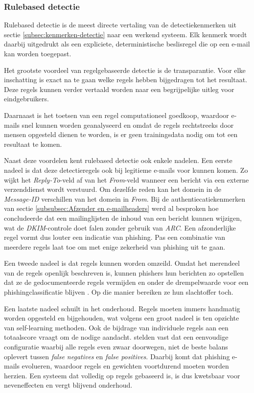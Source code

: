 \subsubsection{Rulebased detectie}
\label{subsubsec:rulebased-detectie}

Rulebased detectie is de meest directe vertaling van de detectiekenmerken uit sectie \ref{subsec:kenmerken-detectie} naar een werkend systeem. Elk kenmerk wordt daarbij uitgedrukt als een expliciete, deterministische beslisregel die op een e-mail kan worden toegepast.

Het grootste voordeel van regelgebaseerde detectie is de transparantie. Voor elke inschatting is exact na te gaan welke regels hebben bijgedragen tot het resultaat. Deze regels kunnen verder vertaald worden naar een begrijpelijke uitleg voor eindgebruikers.

Daarnaast is het toetsen van een regel computationeel goedkoop, waardoor e-mails snel kunnen worden geanalyseerd en omdat de regels rechtstreeks door mensen opgesteld dienen te worden, is er geen trainingsdata nodig om tot een resultaat te komen.

Naast deze voordelen kent rulebased detectie ook enkele nadelen. Een eerste nadeel is dat deze detectieregels ook bij legitieme e-mails voor kunnen komen. Zo wijkt het \emph{Reply-To}-veld af van het \emph{From}-veld wanneer een bericht via een externe verzenddienst wordt verstuurd. Om dezelfde reden kan het domein in de \emph{Message-ID} verschillen van het domein in \emph{From}. Bij de authentiecatiekenmerken van sectie \ref{subsubsec:Afzender en e-mailheaders} werd al besproken hoe \textcite{Herr2026} concludeerde dat een mailinglijsten de inhoud van een bericht kunnen wijzigen, wat de \emph{DKIM}-controle doet falen zonder gebruik van \emph{ARC}.
Een afzonderlijke regel vormt dus louter een indicatie van phishing. Pas een combinatie van meerdere regels laat toe om met enige zekerheid van phishing uit te gaan.

Een tweede nadeel is dat regels kunnen worden omzeild. Omdat het merendeel van de regels openlijk beschreven is, kunnen phishers hun berichten zo opstellen dat ze de gedocumenteerde regels vermijden en onder de drempelwaarde voor een phishingclassificatie blijven \autocite{Biggio2017}. Op die manier bereiken ze hun slachtoffer toch.

Een laatste nadeel schuilt in het onderhoud. Regels moeten immers handmatig worden opgesteld en bijgehouden, wat volgens \textcite{Sebastiani2001} een groot nadeel is ten opzichte van self-learning methoden. Ook de bijdrage van individuele regels aan een totaalscore vraagt om de nodige aandacht. \textcite{Basnet2012} stelden vast dat een eenvoudige configuratie waarbij alle regels even zwaar doorwegen, niet de beste balans oplevert tussen \emph{false negatives} en \emph{false positives}. Daarbij komt dat phishing e-mails evolueren, waardoor regels en gewichten voortdurend moeten worden herzien. Een systeem dat volledig op regels gebaseerd is, is dus kwetsbaar voor neveneffecten en vergt blijvend onderhoud.